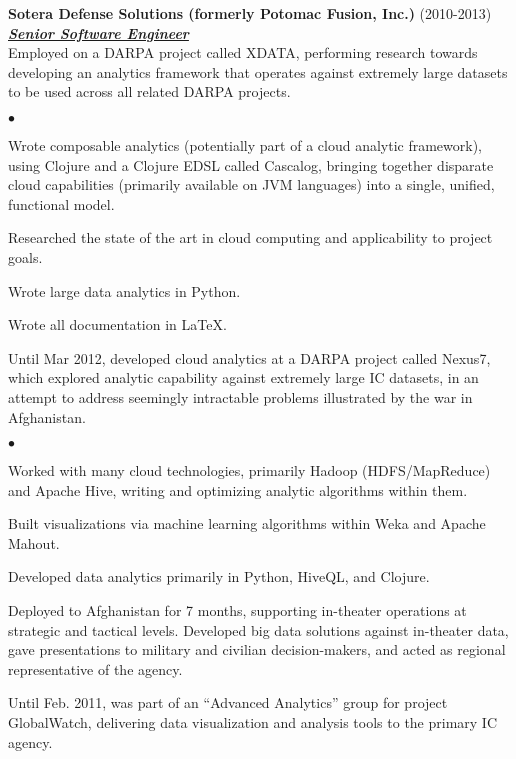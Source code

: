 \documentclass{article}
\newcommand{\employer}[3]{{ \textbf{#1} (#2)\\ \underline{\textbf{\emph{#3}}}\\  }}
\newenvironment{achievements}{\begin{list}{$\bullet$}{\topsep 0pt \itemsep
      -2pt}}{\vspace*{4pt}\end{list}}
\begin{document}
\employer{Sotera Defense Solutions (formerly Potomac Fusion,
  Inc.)}{2010-2013}{Senior Software Engineer} Employed on a DARPA project
called XDATA, performing research towards developing an analytics framework
that operates against extremely large datasets to be used across all related
DARPA projects.
\begin{achievements}
\item Wrote composable analytics (potentially part of a cloud analytic
  framework), using Clojure and a Clojure EDSL called Cascalog, bringing
  together disparate cloud capabilities (primarily available on JVM languages)
  into a single, unified, functional model.
\item Researched the state of the art in cloud computing and applicability to
  project goals.
\item Wrote large data analytics in Python.
\item Wrote all documentation in \LaTeX.
\end{achievements}
Until Mar 2012, developed cloud analytics at a DARPA project called Nexus7,
which explored analytic capability against extremely large IC datasets, in an
attempt to address seemingly intractable problems illustrated by the war in
Afghanistan.
\begin{achievements}
\item Worked with many cloud technologies, primarily Hadoop (HDFS/MapReduce)
  and Apache Hive, writing and optimizing analytic algorithms within them.
\item Built visualizations via machine learning algorithms within Weka and
  Apache Mahout.
\item Developed data analytics primarily in Python, HiveQL, and Clojure.
\item Deployed to Afghanistan for 7 months, supporting in-theater operations at
  strategic and tactical levels.  Developed big data solutions against
  in-theater data, gave presentations to military and civilian decision-makers,
  and acted as regional representative of the agency.
\end{achievements}
Until Feb. 2011, was part of an ``Advanced Analytics'' group for project
GlobalWatch, delivering data visualization and analysis tools to the primary IC
agency.
\end{document}
